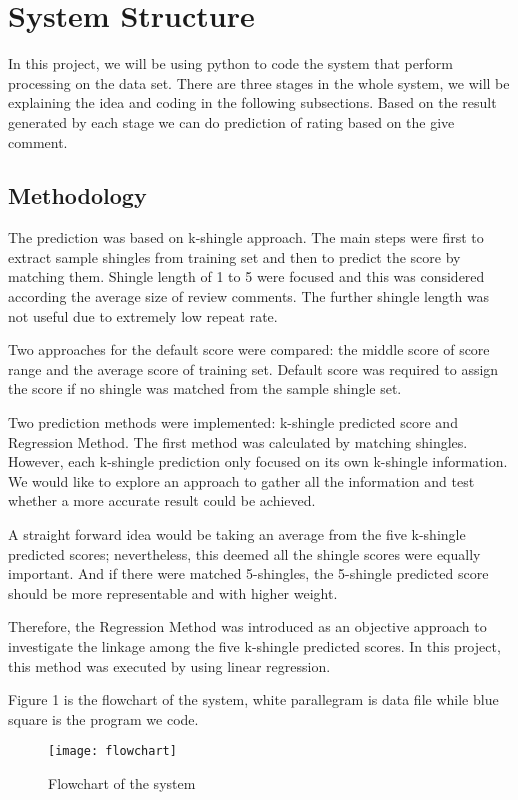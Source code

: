 \section{System Structure}
In this project, we will be using python to code the system that perform processing on the data set. There are three stages in the whole system, we will be explaining the idea and coding in the following subsections. Based on the result generated by each stage we can do prediction of rating based on the give comment.

\subsection{Methodology}
The prediction was based on k-shingle approach. The main steps were first to extract sample shingles from training set and then to predict the score by matching them. Shingle length of 1 to 5 were focused and this was considered according the average size of review comments. The further shingle length was not useful due to extremely low repeat rate.

Two approaches for the default score were compared: the middle score of score range and the average score of training set. Default score was required to assign the score if no shingle was matched from the sample shingle set.

Two prediction methods were implemented: k-shingle predicted score and Regression Method. The first method was calculated by matching shingles. However, each k-shingle prediction only focused on its own k-shingle information. We would like to explore an approach to gather all the information and test whether a more accurate result could be achieved.

A straight forward idea would be taking an average from the five k-shingle predicted scores; nevertheless, this deemed all the shingle scores were equally important. And if there were matched 5-shingles, the 5-shingle predicted score should be more representable and with higher weight.

Therefore, the Regression Method was introduced as an objective approach to investigate the linkage among the five k-shingle predicted scores. In this project, this method was executed by using linear regression.

Figure 1 is the flowchart of the system, white parallegram is data file while blue square is the program we code.

\begin{figure}
\texttt{[image: flowchart]}
\caption{Flowchart of the system}
\end{figure}

